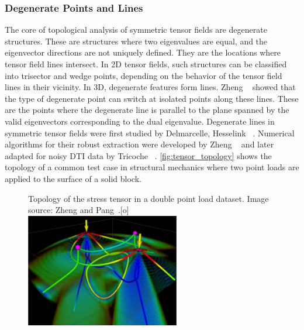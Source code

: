\subsubsection{Degenerate Points and Lines} %
%
The core of topological analysis of symmetric tensor fields are degenerate
structures.
%
These are structures where two eigenvalues are equal, and the eigenvector
directions are not uniquely defined.
%
They are the locations where tensor field lines intersect.
%
In \ac{2D} tensor fields, such structures can be classified into trisector and
wedge points, depending on the behavior of the tensor field lines in their
vicinity.
%
In \ac{3D}, degenerate features form lines.
%
Zheng \etal~\cite{Zheng2005b} showed that the type of degenerate point can
switch at isolated points along these lines.
%
These are the points where the degenerate line is parallel to the plane spanned
by the valid eigenvectors corresponding to the dual eigenvalue.
%
Degenerate lines in symmetric tensor fields were first studied by Delmarcelle,
Hesselink \etal~\cite{Delmarcelle1994,Hesselink1997}.
%
Numerical algorithms for their robust extraction were developed by Zheng
\etal~\cite{Zheng2004,Zheng2005} and later adapted for noisy \ac{DTI} data by
Tricoche \etal~\cite{Tricoche2008}.
%
\autoref{fig:tensor_topology} shows the topology of a common test case in
structural mechanics where two point loads are applied to the surface of a solid
block.
%
\begin{figure}[t]
    \begin{captionbeside}
        {Topology of the stress tensor in a double point load dataset.
         Image source: Zheng and Pang~\cite{Zheng2004}.}[o]
        \includegraphics[width=0.6\textwidth]{figures/tensor_topology.png}
    \end{captionbeside}
    \label{fig:tensor_topology}
\end{figure}
%

